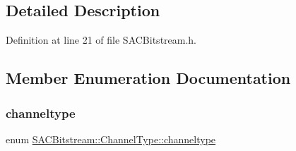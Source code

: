 \subsection{Detailed Description}


Definition at line 21 of file S\+A\+C\+Bitstream.\+h.



\subsection{Member Enumeration Documentation}
\mbox{\label{struct_s_a_c_bitstream_1_1_channel_type_a31c32b34085c06a1c58d920ca28c17c9}} 
\subsubsection{\texorpdfstring{channeltype}{channeltype}}
{\footnotesize\ttfamily enum \hyperlink{struct_s_a_c_bitstream_1_1_channel_type_a31c32b34085c06a1c58d920ca28c17c9}{S\+A\+C\+Bitstream\+::\+Channel\+Type\+::channeltype}}

